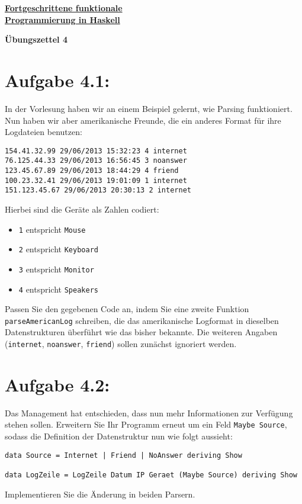 \documentclass[a4paper,10pt]{scrartcl}
\newcommand{\underfat}[1]{\underline{\textbf{#1}}}
\newcommand{\theuebungszettel}{4}
\begin{document}
\begin{center}
  \begin{huge}
    \underfat{Fortgeschrittene funktionale}\\
    \underfat{Programmierung in Haskell}\\
  \end{huge}
\begin{LARGE}
\textbf{Übungszettel \theuebungszettel}
\end{LARGE}
\end{center}
\section*{Aufgabe \theuebungszettel.1:}
In der Vorlesung haben wir an einem Beispiel gelernt, wie Parsing funktioniert. Nun haben wir aber amerikanische Freunde, die ein anderes Format für ihre Logdateien benutzen:
\begin{verbatim}
154.41.32.99 29/06/2013 15:32:23 4 internet
76.125.44.33 29/06/2013 16:56:45 3 noanswer
123.45.67.89 29/06/2013 18:44:29 4 friend
100.23.32.41 29/06/2013 19:01:09 1 internet
151.123.45.67 29/06/2013 20:30:13 2 internet
\end{verbatim}
Hierbei sind die Geräte als Zahlen codiert:
\begin{itemize}
 \item \texttt{1} entspricht \texttt{Mouse}
 \item \texttt{2} entspricht \texttt{Keyboard}
 \item \texttt{3} entspricht \texttt{Monitor}
 \item \texttt{4} entspricht \texttt{Speakers}
\end{itemize}

Passen Sie den gegebenen Code an, indem Sie eine zweite Funktion \texttt{parseAmericanLog} schreiben, die das amerikanische Logformat in dieselben Datenstrukturen überführt wie das bisher bekannte. Die weiteren Angaben (\texttt{internet}, \texttt{noanswer}, \texttt{friend}) sollen zunächst ignoriert werden.

\section*{Aufgabe \theuebungszettel.2:}
Das Management hat entschieden, dass nun mehr Informationen zur Verfügung stehen sollen. Erweitern Sie Ihr Programm erneut um ein Feld \texttt{Maybe Source}, sodass die Definition der Datenstruktur nun wie folgt aussieht:
\begin{verbatim}
data Source = Internet | Friend | NoAnswer deriving Show

data LogZeile = LogZeile Datum IP Geraet (Maybe Source) deriving Show
\end{verbatim}
Implementieren Sie die Änderung in beiden Parsern.\smallskip
\end{document}
